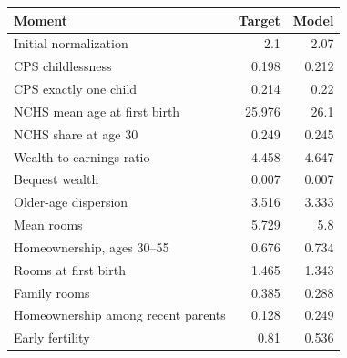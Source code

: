 \begingroup\small
\setlength{\tabcolsep}{3pt}
\renewcommand{\arraystretch}{1.04}
\begin{tabularx}{\linewidth}{Xrr}
\toprule
Moment & Target & Model \\
\midrule
Initial normalization & 2.1 & 2.07 \\
CPS childlessness & 0.198 & 0.212 \\
CPS exactly one child & 0.214 & 0.22 \\
NCHS mean age at first birth & 25.976 & 26.1 \\
NCHS share at age 30 & 0.249 & 0.245 \\
Wealth-to-earnings ratio & 4.458 & 4.647 \\
Bequest wealth & 0.007 & 0.007 \\
Older-age dispersion & 3.516 & 3.333 \\
Mean rooms & 5.729 & 5.8 \\
Homeownership, ages 30--55 & 0.676 & 0.734 \\
Rooms at first birth & 1.465 & 1.343 \\
Family rooms & 0.385 & 0.288 \\
Homeownership among recent parents & 0.128 & 0.249 \\
Early fertility & 0.81 & 0.536 \\
\bottomrule
\end{tabularx}
\endgroup
